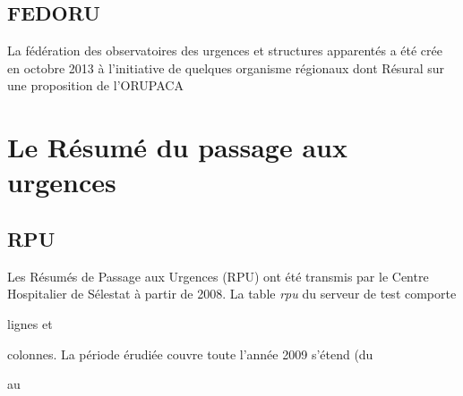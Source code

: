 \documentclass[12pt,english,french,twoside]{report}\usepackage[]{graphicx}\usepackage[]{color}
\begin{document}
\section*{FEDORU}
  
La fédération des observatoires des urgences et structures apparentés a été crée en octobre 2013 à l'initiative de quelques organisme régionaux dont Résural sur une proposition de l'ORUPACA 

  
\chapter{Le Résumé du passage aux urgences}


\section*{RPU}

Les Résumés de Passage aux Urgences (RPU) ont été transmis par le Centre Hospitalier de Sélestat à partir de 2008. 
La table \emph{rpu} du serveur de test comporte 

{\ttfamily\noindent\bfseries\color{errorcolor}{\\Error in nrow(d2) : objet 'd2' introuvable}} lignes et 

{\ttfamily\noindent\bfseries\color{errorcolor}{\\Error in ncol(d2) : objet 'd2' introuvable}} colonnes. La période érudiée couvre toute l'année 2009 s'étend (du 

{\ttfamily\noindent\bfseries\color{errorcolor}{\\Error in eval(expr, envir, enclos) : objet 'd2' introuvable}} au 
\end{document}
